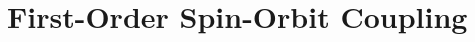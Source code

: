\documentclass[12pt]{report}
\numberwithin{equation}{section}
\begin{document}
\section{First-Order Spin-Orbit Coupling}
\end{document}
